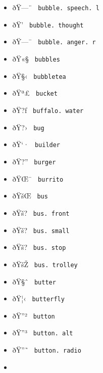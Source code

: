 \begin{itemize}
\item
  \label{symbol-bubble.speech.l}{{ ðŸ---¨ }
  \texttt{\ bubble.\ speech.\ l\ }}
\item
  \label{symbol-bubble.thought}{{ ðŸ'­ }
  \texttt{\ bubble.\ thought\ }}
\item
  \label{symbol-bubble.anger.r}{{ ðŸ---¯ }
  \texttt{\ bubble.\ anger.\ r\ }}
\item
  \label{symbol-bubbles}{{ ðŸ«§ } \texttt{\ bubbles\ }}
\item
  \label{symbol-bubbletea}{{ ðŸ§‹ }
  \texttt{\ bubbletea\ }}
\item
  \label{symbol-bucket}{{ ðŸª£ } \texttt{\ bucket\ }}
\item
  \label{symbol-buffalo.water}{{ ðŸ?ƒ }
  \texttt{\ buffalo.\ water\ }}
\item
  \label{symbol-bug}{{ ðŸ?› } \texttt{\ bug\ }}
\item
  \label{symbol-builder}{{ ðŸ`· } \texttt{\ builder\ }}
\item
  \label{symbol-burger}{{ ðŸ?'' } \texttt{\ burger\ }}
\item
  \label{symbol-burrito}{{ ðŸŒ¯ } \texttt{\ burrito\ }}
\item
  \label{symbol-bus}{{ ðŸšŒ } \texttt{\ bus\ }}
\item
  \label{symbol-bus.front}{{ ðŸš? }
  \texttt{\ bus.\ front\ }}
\item
  \label{symbol-bus.small}{{ ðŸš? }
  \texttt{\ bus.\ small\ }}
\item
  \label{symbol-bus.stop}{{ ðŸš? }
  \texttt{\ bus.\ stop\ }}
\item
  \label{symbol-bus.trolley}{{ ðŸšŽ }
  \texttt{\ bus.\ trolley\ }}
\item
  \label{symbol-butter}{{ ðŸ§ˆ } \texttt{\ butter\ }}
\item
  \label{symbol-butterfly}{{ ðŸ¦‹ }
  \texttt{\ butterfly\ }}
\item
  \label{symbol-button}{{ ðŸ''² } \texttt{\ button\ }}
\item
  \label{symbol-button.alt}{{ ðŸ''³ }
  \texttt{\ button.\ alt\ }}
\item
  \label{symbol-button.radio}{{ ðŸ''˜ }
  \texttt{\ button.\ radio\ }}
\item

\end{itemize}
